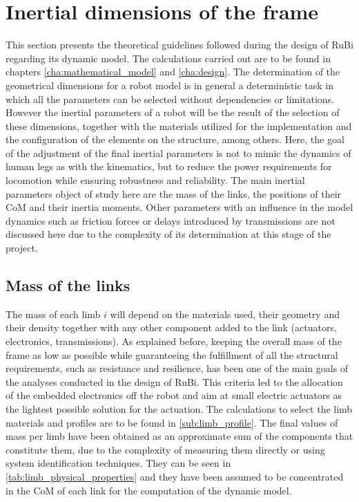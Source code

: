 
\section{Inertial dimensions of the frame} %
\label{sec:physical_properties}
This section presents the theoretical guidelines followed during the design of RuBi regarding its dynamic model.
The calculations carried out are to be found in chapters \ref{cha:mathematical_model} and \ref{cha:design}. 
The determination of the geometrical dimensions for a robot model is in general a deterministic task in which all the parameters can be selected without dependencies or limitations.
However the inertial parameters of a robot will be the result of the selection of these dimensions, together with the materials utilized for the implementation and the configuration of the elements on the structure, among others.
Here, the goal of the adjustment of the final inertial parameters is not to mimic the dynamics of human legs as with the kinematics, but to reduce the power requirements for locomotion while ensuring robustness and reliability.
The main inertial parameters object of study here are the mass of the links, the positions of their CoM and their inertia moments.
Other parameters with an influence in the model dynamics such as friction forces or delays introduced by transmissions are not discussed here due to the complexity of its determination at this stage of the project.

\subsection{Mass of the links} %
\label{sub:mass_of_the_limbs}
The mass of each limb $i$ will depend on the materials used, their geometry and their density together with any other component added to the link (actuators, electronics, transmissions).
As explained before, keeping the overall mass of the frame as low as possible while guaranteeing the fulfillment of all the structural requirements, such as resistance and resilience, has been one of the main goals of the analyses conducted in the design of RuBi.
This criteria led to the allocation of the embedded electronics off the robot and aim at small electric actuators as the lightest possible solution for the actuation. 
The calculations to select the limb materials and profiles are to be found in \ref{sub:limb_profile}.
The final values of mass per limb have been obtained as an approximate sum of the components that constitute them, due to the complexity of measuring them directly or using system identification techniques. 
They can be seen in \ref{tab:limb_physical_properties} and they have been assumed to be concentrated in the CoM of each link for the computation of the dynamic model.

